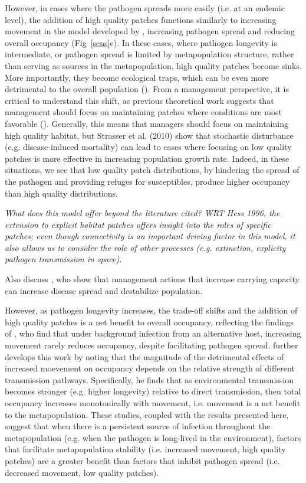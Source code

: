 \documentclass{svjour3}
\begin{document}
However, in cases where the pathogen spreads more easily (i.e. at an endemic level), the addition of high quality patches functions similarly to increasing movement in the model developed by \cite{Hess1996}, increasing pathogen spread and reducing overall occupancy (Fig~\ref{sens}c).  In these cases, where pathogen longevity is intermediate, or pathogen spread is limited by metapopulation structure, rather than serving as sources in the metapopulation, high quality patches become sinks.  More importantly, they become ecological traps, which can be even more detrimental to the overall population (\cite{Kristan2003}).  From a management perspective, it is critical to understand this shift, as previous theoretical work suggests that management should focus on maintaining patches where conditions are most favorable (\cite{Strasser2010}).  Generally, this means that managers should focus on maintaining high quality habitat, but Strasser et al. (2010) show that stochastic disturbance (e.g. disease-induced mortality) can lead to cases where focusing on low quality patches is more effective in increasing population growth rate.  Indeed, in these situations, we see that low quality patch distributions, by hindering the spread of the pathogen and providing refuges for susceptibles, produce higher occupancy than high quality distributions.  

\emph{What does this model offer beyond the literature cited?  WRT Hess 1996, the extension to explicit habitat patches offers insight into the roles of specific patches; even though connectivity is an important driving factor in this model, it also allows us to consider the role of other processes (e.g. extinction, explicity pathogen transmission in space).}

Also discuss \cite{Sharp2011}, who show that management actions that increase carrying capacity can increase disease spread and destabilize population.

However, as pathogen longevity increases, the trade-off shifts and the addition of high quality patches is a net benefit to overall occupancy, reflecting the findings of \cite{Gog2002}, who find that under background infection from an alternative host, increasing movement rarely reduces occupancy, despite facilitating pathogen spread.  \cite{Park2012} further develops this work by noting that the magnitude of the detrimental effects of increased moevement on occupancy depends on the relative strength of different transmission pathways.  Specifically, he finds that as environmental transmission becomes stronger (e.g. higher longevity) relative to direct transmission, then total occupancy increases monotonically with movement, i.e. movement is a net benefit to the metapopulation.  These studies, coupled with the results presented here, suggest that when there is a persistent source of infection throughout the metapopulation (e.g. when the pathogen is long-lived in the environment), factors that facilitate metapopulation stability (i.e. increased movement, high quality patches) are a greater benefit than factors that inhibit pathogen spread (i.e. decreased movement, low quality patches). 
\end{document}
